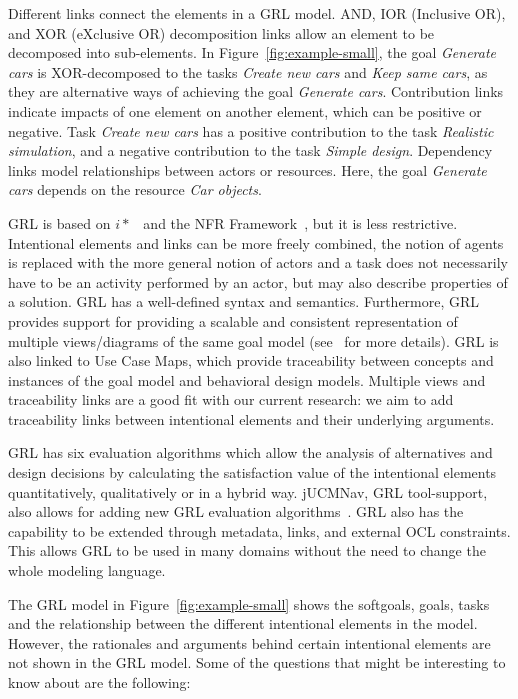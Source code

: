 Different links connect the elements in a GRL model. AND, IOR (Inclusive OR), and XOR (eXclusive OR) decomposition links allow an element to be decomposed into sub-elements. In Figure~\ref{fig:example-small}, the goal \emph{Generate cars} is XOR-decomposed to the tasks \emph{Create new cars} and \emph{Keep same cars}, as they are alternative ways of achieving the goal \emph{Generate cars}. Contribution links indicate impacts of one element on another element, which can be positive or negative. Task \emph{Create new cars} has a positive contribution to the task \emph{Realistic simulation}, and a negative contribution to the task \emph{Simple design}. Dependency links model relationships between actors or resources. Here, the goal \emph{Generate cars} depends on the resource \emph{Car objects}. 

GRL is based on $i*$~\cite{yu1997towards} and the NFR Framework~\cite{chung2012non}, but it is less restrictive. Intentional elements and links can be more freely combined, the notion of agents is replaced with the more general notion of actors and a task does not necessarily have to be an activity performed by an actor, but may also describe properties of a solution. GRL has a well-defined syntax and semantics. Furthermore, GRL provides support for providing a scalable and consistent representation of multiple views/diagrams of the same goal model (see~\cite[Ch.2]{Ghanavati2013} for more details). GRL is also linked to Use Case Maps, which provide traceability between concepts and instances of the goal model and behavioral design models. Multiple views and traceability links are a good fit with our current research: we aim to add traceability links between intentional elements and their underlying arguments. 

GRL has six evaluation algorithms which allow the analysis of alternatives and design decisions by calculating the satisfaction value of the intentional elements quantitatively, qualitatively or in a hybrid way. jUCMNav, GRL tool-support, also allows for adding new GRL evaluation algorithms~\cite{jUCMNav}. GRL also has the capability to be extended through metadata, links, and external OCL constraints. This allows GRL to be used in many domains without the need to change the whole modeling language. 

The GRL model in Figure~\ref{fig:example-small} shows the softgoals, goals, tasks and the relationship between the different intentional elements in the model. However, the rationales and arguments behind certain intentional elements are not shown in the GRL model. Some of the questions that might be interesting to know about are the following:

